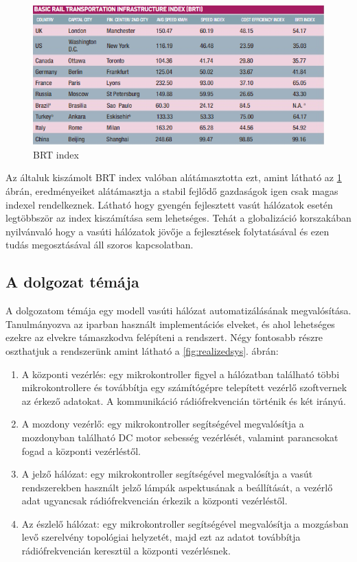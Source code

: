 \documentclass[a4paper,12pt]{article}
\begin{document}
\begin{figure}[htp]
    \centering
	\includegraphics[width=\linewidth]{images/brti.png}
    \caption[Basic Rail Transportation Infrastructure Index]{BRT index}
	\label{fig:brti}
\end{figure}
    
Az általuk kiszámolt BRT index valóban alátámasztotta ezt, amint látható az \ref{fig:brti} ábrán, eredményeiket alátámasztja a stabil fejlődő gazdaságok igen csak magas indexel rendelkeznek.
Látható hogy gyengén fejlesztett vasút hálózatok esetén legtöbbször az index kiszámítása sem lehetséges. 
Tehát a globalizáció korszakában nyilvánvaló hogy a vasúti hálózatok jövője a fejlesztések folytatásával és ezen tudás megosztásával áll szoros kapcsolatban. 

\subsection{A dolgozat témája}
A dolgozatom témája egy modell vasúti hálózat automatizálásának megvalósítása. Tanulmányozva az iparban használt implementációs elveket, és ahol lehetséges ezekre az elvekre támaszkodva felépíteni a rendszert. Négy fontosabb részre oszthatjuk a rendszerünk amint látható a \ref{fig:realizedsys}. ábrán:
\begin{enumerate}
    \item A központi vezérlés: egy mikrokontroller figyel a hálózatban található többi mikrokontrollere és továbbítja egy számítógépre telepített vezérlő szoftvernek az érkező adatokat. A kommunikáció rádiófrekvencián történik és két irányú.
    \item A mozdony vezérlő: egy mikrokontroller segítségével megvalósítja a mozdonyban található DC motor sebesség vezérlését, valamint parancsokat fogad a központi vezérléstől.
    \item A jelző  hálózat: egy mikrokontroller segítségével megvalósítja a vasút rendszerekben használt jelző lámpák aspektusának a beállítását, a vezérlő adat ugyancsak rádiófrekvencián érkezik a központi vezérléstől.
    \item Az észlelő hálózat:  egy mikrokontroller segítségével megvalósítja a mozgásban levő szerelvény topológiai helyzetét, majd ezt az adatot továbbítja rádiófrekvencián keresztül a központi vezérlésnek.
\end{enumerate}
\end{document}
